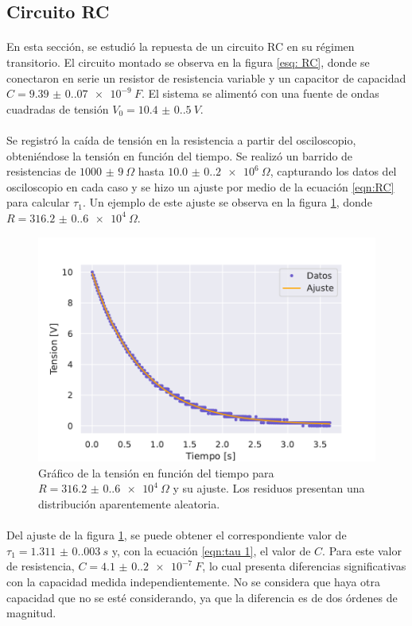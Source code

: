 \subsection{Circuito RC}\label{sec: RC}
\paragraph{}
En esta sección, se estudió la repuesta de un circuito RC en su régimen transitorio. El circuito montado se observa en la figura \ref{esq: RC}, donde se conectaron en serie un resistor de resistencia variable y un capacitor de capacidad $C=\SI{9.39(0.07)e-9}{F}$. El sistema se alimentó con una fuente de ondas cuadradas de tensión $V_0=\SI{10.4(0.5)}{V}$. 
\paragraph{}
Se registró la caída de tensión en la resistencia a partir del osciloscopio, obteniéndose la tensión en función del tiempo. Se realizó un barrido de resistencias de $\SI{1000(9)}{\Omega}$ hasta $\SI{10.0(0.2)e6}{\Omega}$, capturando los datos del osciloscopio en cada caso y se hizo un ajuste por medio de la ecuación \eqref{eqn:RC} para calcular $\tau_1$. Un ejemplo de este ajuste se observa en la figura \ref{fig:RC barrido}, donde $R=\SI{316.2(0.6)e4}{\Omega}$.
\begin{figure} [H]
    \centering
    \includegraphics[scale=0.7]{Figuras/RC/RC 3162000.pdf}
    \caption{Gráfico de la tensión en función del tiempo para $R=\SI{316.2(0.6)e4}{\Omega}$ y su ajuste. Los residuos presentan una distribución aparentemente aleatoria.}
    \label{fig:RC barrido}
\end{figure}
\paragraph{}
Del ajuste de la figura \ref{fig:RC barrido}, se puede obtener el correspondiente valor de $\tau_1=\SI{1.311(0.003)}{s}$ y, con la ecuación \eqref{eqn:tau 1}, el valor de $C$. Para este valor de resistencia, $C=\SI{4.1(0.2)e-7}{F}$, lo cual presenta diferencias significativas con la capacidad medida independientemente. No se considera que haya otra capacidad que no se esté considerando, ya que la diferencia es de dos órdenes de magnitud.
